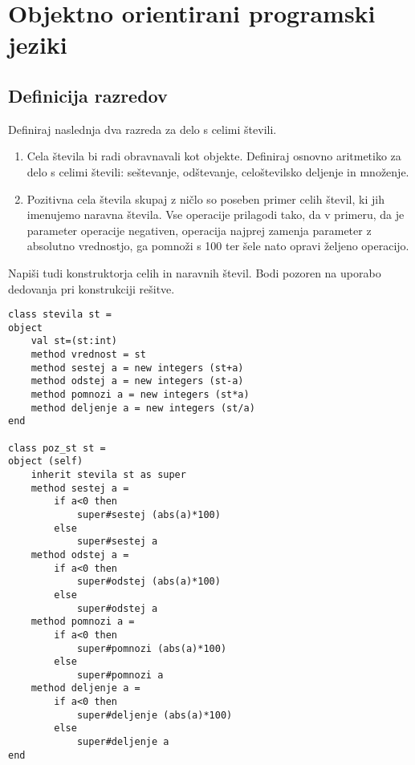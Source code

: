 \chapter{Objektno orientirani programski jeziki}



\section{Definicija razredov}



\begin{ex}
Definiraj naslednja dva razreda za delo s celimi \v stevili.

\begin{enumerate}
\item
Cela \v stevila bi radi obravnavali kot objekte. Definiraj osnovno aritmetiko za delo s celimi \v stevili: se\v stevanje, od\v stevanje, celo\v stevilsko deljenje in mno\v zenje.
\item
Pozitivna cela \v stevila skupaj z ni\v clo so poseben primer celih \v stevil, ki jih imenujemo naravna \v stevila. Vse operacije prilagodi tako, da v primeru, da je parameter operacije negativen, operacija najprej zamenja parameter z absolutno vrednostjo, ga pomno\v zi s 100 ter \v sele nato opravi \v zeljeno operacijo.
\end{enumerate}
Napi\v si tudi konstruktorja celih in naravnih \v stevil. Bodi pozoren na uporabo dedovanja pri konstrukciji re\v sitve.

\begin{sol}
\begin{lstlisting}
class stevila st = 
object
    val st=(st:int)
    method vrednost = st 
    method sestej a = new integers (st+a)
    method odstej a = new integers (st-a)
    method pomnozi a = new integers (st*a)
    method deljenje a = new integers (st/a)
end

class poz_st st =
object (self)
    inherit stevila st as super
    method sestej a = 
        if a<0 then 
            super#sestej (abs(a)*100)
        else
            super#sestej a
    method odstej a = 
        if a<0 then 
            super#odstej (abs(a)*100)
        else
            super#odstej a
    method pomnozi a = 
        if a<0 then 
            super#pomnozi (abs(a)*100)
        else
            super#pomnozi a
    method deljenje a = 
        if a<0 then 
            super#deljenje (abs(a)*100)
        else
            super#deljenje a
end
\end{lstlisting}
\end{sol}
\end{ex}





